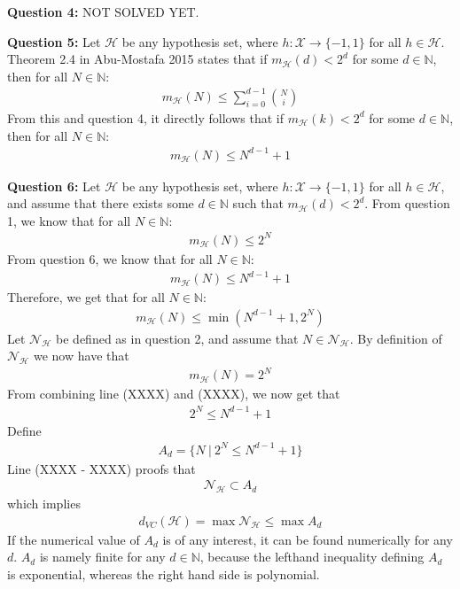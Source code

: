 \textbf{Question 4:} NOT SOLVED YET.

\textbf{Question 5:} Let $\mathcal{H}$ be any hypothesis set, where $h:\mathcal{X}\to \{-1,1\}$ for all $h\in \mathcal{H}$. Theorem 2.4 in Abu-Mostafa 2015 states that if $m_\mathcal{H}(d) < 2^d$ for some $d \in \mathbb{N}$, then for all $N\in \mathbb{N}$:
\begin{align}
m_\mathcal{H}(N) \leq \sum_{i=0}^{d-1} \binom{N}{i}
\end{align}
From this and question 4, it directly follows that if $m_\mathcal{H}(k) < 2^d$ for some $d \in \mathbb{N}$, then for all $N\in \mathbb{N}$:
\begin{align}
m_\mathcal{H}(N) \leq N^{d-1} + 1
\end{align}

\textbf{Question 6:} Let $\mathcal{H}$ be any hypothesis set, where $h:\mathcal{X}\to \{-1,1\}$ for all $h\in \mathcal{H}$, and assume that there exists some $d\in \mathbb{N}$ such that $m_\mathcal{H}(d) < 2^d$. From question 1, we know that for all $N\in \mathbb{N}$:
\begin{align}
m_\mathcal{H}(N) \leq 2^N
\end{align}
From question 6, we know that for all $N\in \mathbb{N}$:
\begin{align}
m_\mathcal{H}(N) \leq N^{d-1} + 1
\end{align}
Therefore, we get that for all $N\in \mathbb{N}$:
\begin{align}
m_\mathcal{H}(N) \leq \min (N^{d-1} + 1, 2^N)
\end{align}
Let $\mathcal{N}_\mathcal{H}$ be defined as in question 2, and assume that $N \in \mathcal{N}_\mathcal{H}$. By definition of $\mathcal{N}_\mathcal{H}$ we now have that
\begin{align}
m_\mathcal{H}(N)=2^N 
\end{align}
From combining line (XXXX) and (XXXX), we now get that
\begin{align}
2^N \leq N^{d-1} + 1
\end{align}
Define 
\begin{align}
A_d = \{N \ |\  2^N \leq N^{d-1} + 1\}
\end{align}
Line (XXXX - XXXX) proofs that
\begin{align}
\mathcal{N}_\mathcal{H}\subset A_d
\end{align}
which implies
\begin{align}
d_{VC}(\mathcal{H}) = \max \mathcal{N}_\mathcal{H} \leq \max A_d
\end{align}
If the numerical value of $A_d$ is of any interest, it can be found numerically for any $d$. $A_d$ is namely finite for any $d\in \mathbb{N}$, because the lefthand inequality defining $A_d$ is exponential, whereas the right hand side is polynomial.


